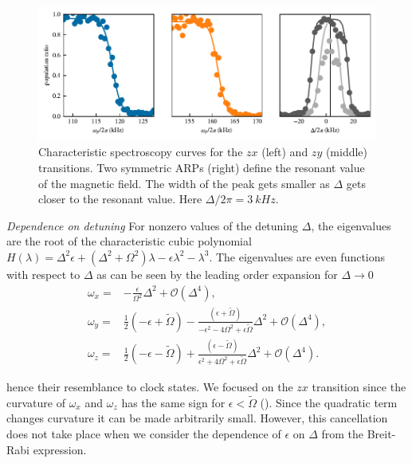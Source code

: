 \begin{figure}[ht]
    \centering
    \includegraphics[]{Figures/Chapter6/figS2}
    \caption[]{Characteristic spectroscopy curves for the $zx$ (left) and $zy$ (middle) transitions.
    Two symmetric ARPs (right) define the resonant value of the magnetic field.
    The width of the peak gets smaller as $\Delta$ gets closer to the resonant value.
    Here $\Delta/2\pi=\SI{3}{kHz}$.}
    \label{fig:s2}
\end{figure}




\textit{Dependence on detuning}
For nonzero values of the detuning $\Delta$, the eigenvalues are the root of the characteristic cubic polynomial $H(\lambda)=\Delta^2\epsilon + (\Delta^2 + \Omega^2) \lambda - \epsilon \lambda^2 - \lambda^3$.
The eigenvalues are even functions with respect to $\Delta$ as can be seen by the leading order expansion for $\Delta\to 0$
\begin{align}
    \omega_x =& -\frac{\epsilon}{\Omega^2} \Delta^2 + \mathcal{O}(\Delta^4), \nonumber \\
    \omega_y =& \frac 12 (-\epsilon + \tilde\Omega) - \frac{(\epsilon + \tilde\Omega)}{-\epsilon^2-4\Omega^2+\epsilon\tilde\Omega} \Delta^2 + \mathcal{O}(\Delta^4), \label{eq:exp} \\
    \omega_z =& \frac 12 (-\epsilon - \tilde\Omega) + \frac{(\epsilon - \tilde\Omega)}{\epsilon^2+4\Omega^2+\epsilon\tilde\Omega} \Delta^2 + \mathcal{O}(\Delta^4). \nonumber
\end{align}

hence their resemblance to clock states.
We focused on the $zx$ transition since the curvature of $\omega_x$ and $\omega_z$ has the same sign for $\epsilon < \tilde \Omega$ ().
Since the quadratic term changes curvature it can be made arbitrarily small.
However, this cancellation does not take place when we consider the dependence of $\epsilon$ on $\Delta$ from the Breit-Rabi expression.




